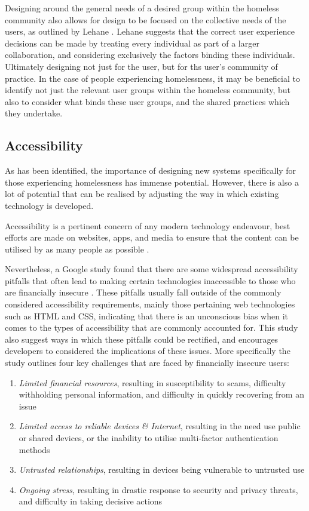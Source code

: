 Designing around the general needs of a desired group within the homeless community also allows for design to be focused on the collective needs of the users, as outlined by Lehane \cite{lehane2010designing}. Lehane suggests that the correct user experience decisions can be made by treating every individual as part of a larger collaboration, and considering exclusively the factors binding these individuals. Ultimately designing not just for the user, but for ths user's community of practice. In the case of people experiencing homelessness, it may be beneficial to identify not just the relevant user groups within the homeless community, but also to consider what binds these user groups, and the shared practices which they undertake.

\subsection{Accessibility}

As has been identified, the importance of designing new systems specifically for those experiencing homelessness has immense potential. However, there is also a lot of potential that can be realised by adjusting the way in which existing technology is developed.

Accessibility is a pertinent concern of any modern technology endeavour, best efforts are made on websites, apps, and media to ensure that the content can be utilised by as many people as possible \cite{henry2014accessibility} \cite{brophy2007web}.

Nevertheless, a Google study found that there are some widespread accessibility pitfalls that often lead to making certain technologies inaccessible to those who are financially insecure \cite{sleeper2019tough}. These pitfalls usually fall outside of the commonly considered accessibility requirements, mainly those pertaining web technologies such as HTML and CSS, indicating that there is an unconscious bias when it comes to the types of accessibility that are commonly accounted for. This study also suggest ways in which these pitfalls could be rectified, and encourages developers to considered the implications of these issues. More specifically the study outlines four key challenges that are faced by financially insecure users:

\begin{enumerate}
    \item \emph{Limited financial resources}, resulting in susceptibility to scams, difficulty withholding personal information, and difficulty in quickly recovering from an issue
    \item \emph{Limited access to reliable devices \& Internet}, resulting in the need use public or shared devices, or the inability to utilise multi-factor authentication methods
    \item \emph{Untrusted relationships}, resulting in devices being vulnerable to untrusted use
    \item \emph{Ongoing stress}, resulting in drastic response to security and privacy threats, and difficulty in taking decisive actions
\end{enumerate}

